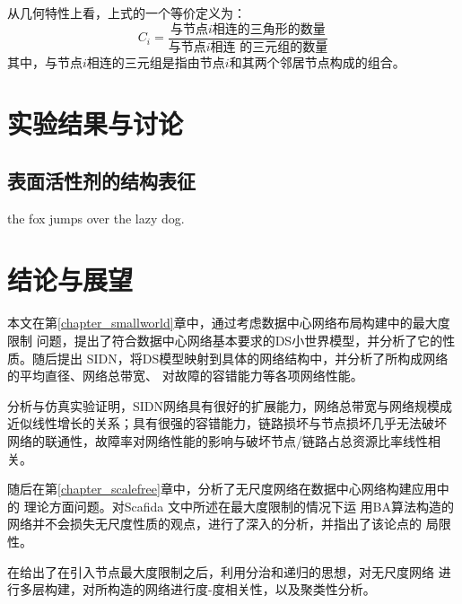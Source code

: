 \documentclass[bachelor,winfonts]{jnuthesis} %
\begin{document}
    \begin{definition}[局部聚类系数]
        从几何特性上看，上式的一个等价定义为：
        \begin{equation}\label{eq:clustering_coefficient_triangle}
        C_i = \frac{\text{与节点$i$相连的三角形的数量}}{\text{与节点$i$相连
                的三元组的数量}}
        \end{equation}
        其中，与节点$i$相连的三元组是指由节点$i$和其两个邻居节点构成的组合。
    \end{definition}
    
    \chapter{实验结果与讨论}\label{chapter:results}
    \section{表面活性剂的结构表征}
    the fox jumps over the lazy dog.
        
    \chapter{结论与展望}\label{chapter:concludes}
    
    本文在第\ref{chapter_smallworld}章中，通过\cite{newman2001structure}考虑数据中心网络布局构建中的最大度限制
    问题，提出了符合数据中心网络基本要求的DS小世界模型，并分析了它的性质。随后提出
    SIDN，将DS模型映射到具体的网络结构中，并分析了所构成网络的平均直径、网络总带宽、
    对故障的容错能力等各项网络性能。
    
    分析与仿真实验证明，SIDN网络具有很好的扩展能力，网络总带宽与网络规模成
    近似线性增长的关系；具有很强的容错能力，链路损坏与节点损坏几乎无法破坏
    网络的联通性，故障率对网络性能的影响与破坏节点/链路占总资源比率线性相关。
    
    随后在第\ref{chapter_scalefree}章中，分析了无尺度网络在数据中心网络构建应用中的
    理论方面问题。对Scafida \cite{gyarmati2010scafida}文中所述在最大度限制的情况下运
    用BA算法构造的网络并不会损失无尺度性质的观点，进行了深入的分析，并指出了该论点的
    局限性。
    
    在给出了在引入节点最大度限制之后，利用分治和递归的思想，对无尺度网络
    进行多层构建，对所构造的网络进行度-度相关性，以及聚类性分析。
    
\end{document}
